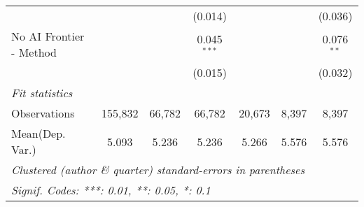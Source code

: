 \begin{tabular}{lcccccc}
                           &               &              & (0.014)       &               &              & (0.036)\\   
   No AI Frontier - Method &               &              & 0.045$^{***}$ &               &              & 0.076$^{**}$\\   
                           &               &              & (0.015)       &               &              & (0.032)\\   
   \midrule
   \emph{Fit statistics}\\
   Observations            & 155,832       & 66,782       & 66,782        & 20,673        & 8,397        & 8,397\\  
Mean(Dep. Var.) & 5.093 & 5.236 & 5.236 & 5.266 & 5.576 & 5.576 \\
   \midrule \midrule
   \multicolumn{7}{l}{\emph{Clustered (author \& quarter) standard-errors in parentheses}}\\
   \multicolumn{7}{l}{\emph{Signif. Codes: ***: 0.01, **: 0.05, *: 0.1}}\\
\end{tabular}
\par\endgroup
